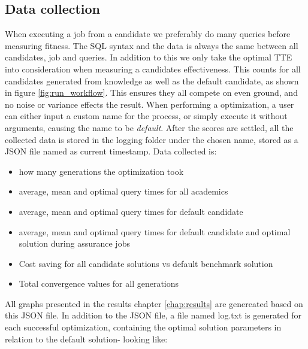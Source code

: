 \documentclass[a4paper,english]{report}
\begin{document}
			\subsection{Data collection}
				When executing a job from a candidate we preferably do many queries before measuring fitness. The SQL syntax and the data is always the same between all candidates, job and queries. In addition to this we only take the optimal TTE into consideration when measuring a candidates effectiveness. This counts for all candidates generated from knowledge as well as the default candidate, as shown in figure \ref{fig:run_workflow}. This ensures they all compete on even ground, and no noise or variance effects the result. When performing a optimization, a user can either input a custom name for the process, or simply execute it without arguments, causing the name to be \textit{default}. After the scores are settled, all the collected data is stored in the logging folder under the chosen name, stored as a JSON file named as current timestamp. Data collected is:
				\begin{itemize}
					\item how many generations the optimization took
					\item average, mean and optimal query times for all academics
					\item average, mean and optimal query times for default candidate
					\item average, mean and optimal query times for default candidate and optimal solution during assurance jobs
					\item Cost saving for all candidate solutions vs default benchmark solution
					\item Total convergence values for all generations
				\end{itemize}
				All graphs presented in the results chapter \ref{chap:results} are genereated based on this JSON file. In addition to the JSON file, a file named log.txt is generated for each successful optimization, containing the optimal solution parameters in relation to the default solution- looking like:
				\scriptsize
\end{document}
